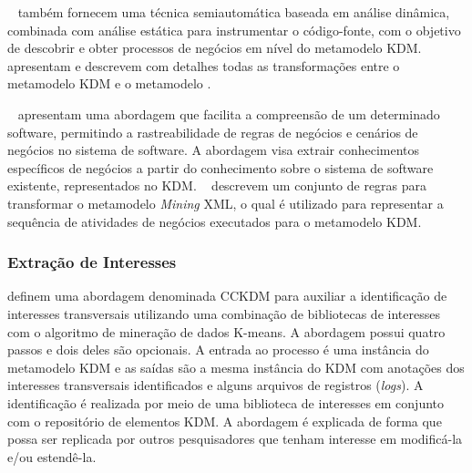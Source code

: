 ~ também fornecem uma técnica semiautomática baseada em análise dinâmica, combinada com análise estática para instrumentar o código-fonte, com o objetivo de descobrir e obter processos de negócios em nível do metamodelo KDM. ~ apresentam e descrevem com detalhes todas as transformações entre o metamodelo KDM e o metamodelo . 

~ apresentam uma abordagem que facilita a compreensão de um determinado software, permitindo a rastreabilidade de regras de negócios e cenários de negócios no sistema de software. A abordagem visa extrair conhecimentos específicos de negócios a partir do conhecimento sobre o sistema de software existente, representados no KDM. ~ descrevem um conjunto de regras para transformar o metamodelo \textit{Mining} XML, o qual é utilizado para representar a sequência de atividades de negócios executados para o metamodelo KDM. 







\subsubsection{Extração de Interesses} %
\label{ssub:Concern Extracting}

 definem uma abordagem denominada CCKDM para auxiliar a identificação de interesses transversais utilizando uma combinação de bibliotecas de interesses com o algoritmo de mineração de dados K-means. A abordagem possui quatro passos  e dois deles são opcionais. A entrada ao processo é uma instância do metamodelo KDM e as saídas são a mesma instância do KDM com anotações dos interesses transversais identificados e alguns arquivos de registros (\textit{logs}). A identificação é realizada por meio de uma biblioteca de interesses em conjunto com o repositório de elementos KDM. A abordagem é explicada de forma que possa ser replicada por outros pesquisadores que tenham interesse em modificá-la e/ou estendê-la.


